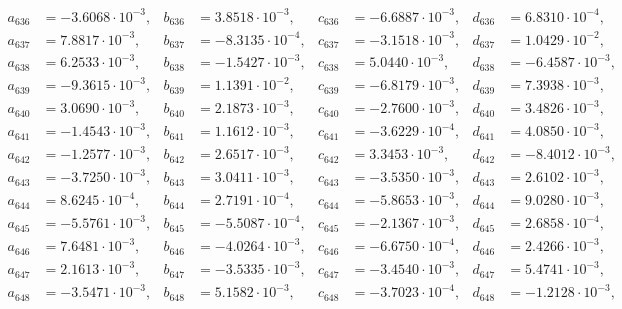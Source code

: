 \begin{align*}
  a_{ 636 } &= -3.6068 \cdot 10^{ -3 }, & b_{ 636 } &= 3.8518 \cdot 10^{ -3 }, & c_{ 636 } &= -6.6887 \cdot 10^{ -3 }, & d_{ 636 } &= 6.8310 \cdot 10^{ -4 }, \\ 
  a_{ 637 } &= 7.8817 \cdot 10^{ -3 }, & b_{ 637 } &= -8.3135 \cdot 10^{ -4 }, & c_{ 637 } &= -3.1518 \cdot 10^{ -3 }, & d_{ 637 } &= 1.0429 \cdot 10^{ -2 }, \\ 
  a_{ 638 } &= 6.2533 \cdot 10^{ -3 }, & b_{ 638 } &= -1.5427 \cdot 10^{ -3 }, & c_{ 638 } &= 5.0440 \cdot 10^{ -3 }, & d_{ 638 } &= -6.4587 \cdot 10^{ -3 }, \\ 
  a_{ 639 } &= -9.3615 \cdot 10^{ -3 }, & b_{ 639 } &= 1.1391 \cdot 10^{ -2 }, & c_{ 639 } &= -6.8179 \cdot 10^{ -3 }, & d_{ 639 } &= 7.3938 \cdot 10^{ -3 }, \\ 
  a_{ 640 } &= 3.0690 \cdot 10^{ -3 }, & b_{ 640 } &= 2.1873 \cdot 10^{ -3 }, & c_{ 640 } &= -2.7600 \cdot 10^{ -3 }, & d_{ 640 } &= 3.4826 \cdot 10^{ -3 }, \\ 
  a_{ 641 } &= -1.4543 \cdot 10^{ -3 }, & b_{ 641 } &= 1.1612 \cdot 10^{ -3 }, & c_{ 641 } &= -3.6229 \cdot 10^{ -4 }, & d_{ 641 } &= 4.0850 \cdot 10^{ -3 }, \\ 
  a_{ 642 } &= -1.2577 \cdot 10^{ -3 }, & b_{ 642 } &= 2.6517 \cdot 10^{ -3 }, & c_{ 642 } &= 3.3453 \cdot 10^{ -3 }, & d_{ 642 } &= -8.4012 \cdot 10^{ -3 }, \\ 
  a_{ 643 } &= -3.7250 \cdot 10^{ -3 }, & b_{ 643 } &= 3.0411 \cdot 10^{ -3 }, & c_{ 643 } &= -3.5350 \cdot 10^{ -3 }, & d_{ 643 } &= 2.6102 \cdot 10^{ -3 }, \\ 
  a_{ 644 } &= 8.6245 \cdot 10^{ -4 }, & b_{ 644 } &= 2.7191 \cdot 10^{ -4 }, & c_{ 644 } &= -5.8653 \cdot 10^{ -3 }, & d_{ 644 } &= 9.0280 \cdot 10^{ -3 }, \\ 
  a_{ 645 } &= -5.5761 \cdot 10^{ -3 }, & b_{ 645 } &= -5.5087 \cdot 10^{ -4 }, & c_{ 645 } &= -2.1367 \cdot 10^{ -3 }, & d_{ 645 } &= 2.6858 \cdot 10^{ -4 }, \\ 
  a_{ 646 } &= 7.6481 \cdot 10^{ -3 }, & b_{ 646 } &= -4.0264 \cdot 10^{ -3 }, & c_{ 646 } &= -6.6750 \cdot 10^{ -4 }, & d_{ 646 } &= 2.4266 \cdot 10^{ -3 }, \\ 
  a_{ 647 } &= 2.1613 \cdot 10^{ -3 }, & b_{ 647 } &= -3.5335 \cdot 10^{ -3 }, & c_{ 647 } &= -3.4540 \cdot 10^{ -3 }, & d_{ 647 } &= 5.4741 \cdot 10^{ -3 }, \\ 
  a_{ 648 } &= -3.5471 \cdot 10^{ -3 }, & b_{ 648 } &= 5.1582 \cdot 10^{ -3 }, & c_{ 648 } &= -3.7023 \cdot 10^{ -4 }, & d_{ 648 } &= -1.2128 \cdot 10^{ -3 }, \\ 

\end{align*}

